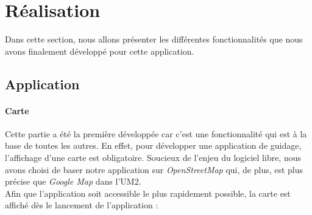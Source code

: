 \documentclass{article}
\begin{document}
	\section{Réalisation}
	Dans cette section, nous allons présenter les différentes fonctionnalités que nous avons finalement développé pour cette application.
	
	\subsection{Application}
	\paragraph{Carte}
	Cette partie a été la première développée car c'est une fonctionnalité qui est à la base de toutes les autres. En effet, pour développer une application de guidage, l'affichage d'une carte est obligatoire. Soucieux de l'enjeu du logiciel libre, nous avons choisi de baser notre application sur \textit{OpenStreetMap} qui, de plus, est plus précise que \textit{Google Map} dans l'UM2. \\
	Afin que l'application soit accessible le plus rapidement possible, la carte est affiché dès le lancement de l'application : \\
	
\end{document}
